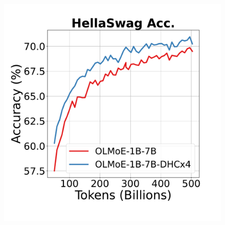 \documentclass{article} %
\begin{document}
\begin{figure}[h]
\begin{minipage}{0.25\textwidth}
     \end{minipage}\hfill
    \begin{minipage}{0.25\textwidth}
        \centering
        \includegraphics[width=\linewidth]{fig/OLMoE_1B7B_HellaSwag_Acc.pdf}


\end{minipage}
\end{figure}
\end{document}
